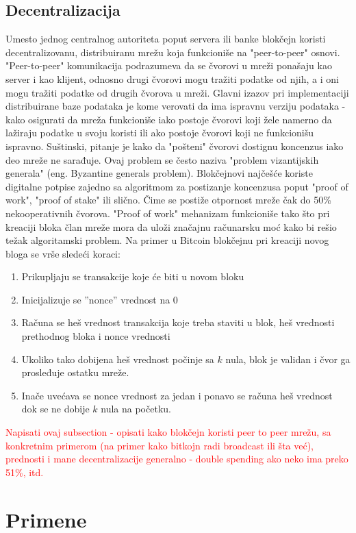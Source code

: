 \documentclass[a4paper]{article}
\newcommand\todo[1]{\textcolor{red}{#1}}
\begin{document}
{\subsection{Decentralizacija}
Umesto jednog centralnog autoriteta poput servera ili banke blokčejn koristi decentralizovanu, distribuiranu mrežu
koja funkcioniše na "peer-to-peer" osnovi. "Peer-to-peer" komunikacija podrazumeva da se čvorovi u mreži ponašaju
kao server i kao klijent, odnosno drugi čvorovi mogu tražiti podatke od njih, a i oni mogu tražiti podatke od drugih čvorova u mreži.
Glavni izazov pri implementaciji distribuirane baze podataka je kome verovati da ima ispravnu verziju podataka -
kako osigurati da mreža funkcioniše iako postoje čvorovi koji žele namerno da lažiraju podatke
u svoju koristi ili ako postoje čvorovi koji ne funkcionišu ispravno. Suštinski, pitanje je kako da
"pošteni" čvorovi dostignu koncenzus iako deo mreže ne sarađuje. Ovaj problem se često naziva "problem vizantijskih generala" (eng. Byzantine generals problem).
Blokčejnovi najčešće koriste digitalne potpise zajedno sa algoritmom za postizanje koncenzusa poput "proof of work", "proof of stake" ili slično.
Čime se postiže otpornost mreže čak do 50\% nekooperativnih čvorova.
"Proof of work" mehanizam funkcioniše tako što pri kreaciji bloka član mreže mora da uloži značajnu računarsku
moć kako bi rešio težak algoritamski problem. Na primer u Bitcoin blokčejnu pri kreaciji novog bloga se vrše sledeći koraci:
\begin{enumerate}
    \item Prikupljaju se transakcije koje će biti u novom bloku
    \item Inicijalizuje se ''nonce'' vrednost na 0
    \item Računa se heš vrednost transakcija koje treba staviti u blok, heš vrednosti prethodnog bloka i nonce vrednosti
    \item Ukoliko tako dobijena heš vrednost počinje sa $k$ nula, blok je validan i čvor ga prosleđuje ostatku mreže.
    \item Inače uvećava se nonce vrednost za jedan i ponavo se računa heš vrednost dok se ne dobije $k$ nula na početku.
\end{enumerate}

\todo{Napisati ovaj subsection - opisati kako blokčejn koristi peer to peer mrežu, sa konkretnim primerom (na primer kako bitkojn radi broadcast ili šta već), prednosti i mane decentralizacije generalno - double spending ako neko ima preko 51\%, itd. }

\section{Primene}
\label{sec:primene}

}
\end{document}

